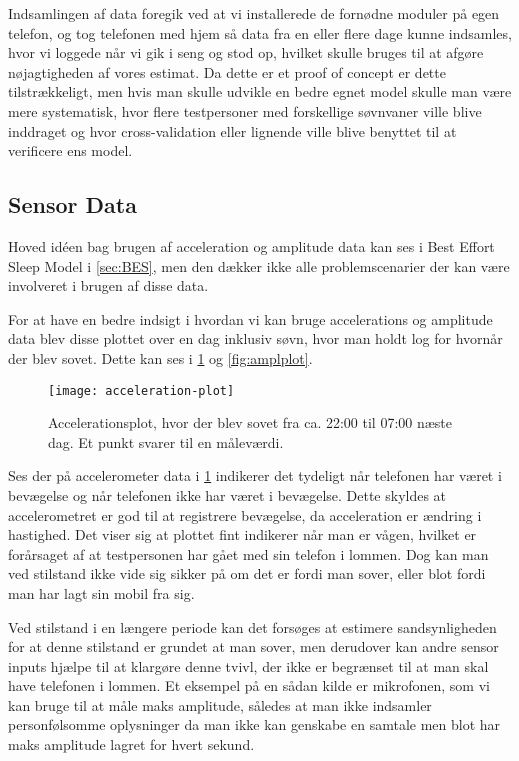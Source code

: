 Indsamlingen af data foregik ved at vi installerede de fornødne moduler på egen telefon, og tog telefonen med hjem så data fra en eller flere dage kunne indsamles, hvor vi loggede når vi gik i seng og stod op, hvilket skulle bruges til at afgøre nøjagtigheden af vores estimat.
Da dette er et proof of concept er dette tilstrækkeligt, men hvis man skulle udvikle en bedre egnet model skulle man være mere systematisk, hvor flere testpersoner med forskellige søvnvaner ville blive inddraget og hvor cross-validation eller lignende ville blive benyttet til at verificere ens model.

\subsection{Sensor Data}
Hoved idéen bag brugen af acceleration og amplitude data kan ses i Best Effort Sleep Model i \cref{sec:BES}, men den dækker ikke alle problemscenarier der kan være involveret i brugen af disse data.

For at have en bedre indsigt i hvordan vi kan bruge accelerations og amplitude data blev disse plottet over en dag inklusiv søvn, hvor man holdt log for hvornår der blev sovet.
Dette kan ses i \cref{fig:accplot} og \cref{fig:amplplot}.

\begin{figure}[h]
	\centering
	\texttt{[image: acceleration-plot]}
	\caption{Accelerationsplot, hvor der blev sovet fra ca. 22:00 til 07:00 næste dag.  Et punkt svarer til en måleværdi.}\label{fig:accplot}
\end{figure}

Ses der på accelerometer data i \cref{fig:accplot} indikerer det tydeligt når telefonen har været i bevægelse og når telefonen ikke har været i bevægelse.
Dette skyldes at accelerometret er god til at registrere bevægelse, da acceleration er ændring i hastighed.
Det viser sig at plottet fint indikerer når man er vågen, hvilket er forårsaget af at testpersonen har gået med sin telefon i lommen.
Dog kan man ved stilstand ikke vide sig sikker på om det er fordi man sover, eller blot fordi man har lagt sin mobil fra sig.

Ved stilstand i en længere periode kan det forsøges at estimere sandsynligheden for at denne stilstand er grundet at man sover, men derudover kan andre sensor inputs hjælpe til at klargøre denne tvivl, der ikke er begrænset til at man skal have telefonen i lommen.
Et eksempel på en sådan kilde er mikrofonen, som vi kan bruge til at måle maks amplitude, således at man ikke indsamler personfølsomme oplysninger da man ikke kan genskabe en samtale men blot har maks amplitude lagret for hvert sekund.

